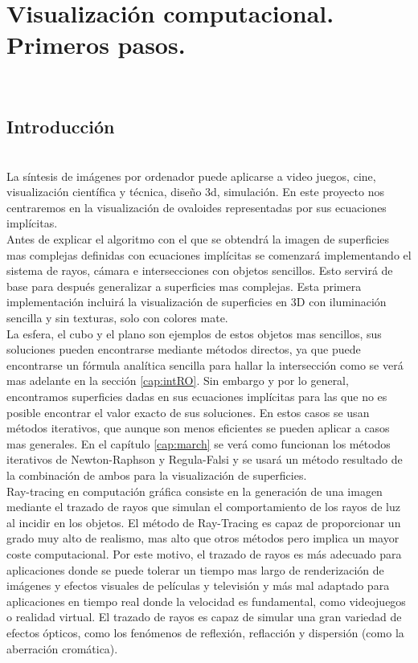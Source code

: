\chapter{Visualización computacional. Primeros pasos.}

${ }$\\
\section{Introducción}
${ }$\\

La síntesis de imágenes por ordenador puede aplicarse a video juegos, cine, visualización científica y técnica, diseño 3d, simulación. En este proyecto nos centraremos en la visualización de ovaloides representadas por sus ecuaciones implícitas.
${ }$\\

Antes de explicar el algoritmo con el que se obtendrá la imagen de superficies mas complejas definidas con ecuaciones implícitas se comenzará implementando el sistema de rayos, cámara e intersecciones con objetos sencillos. Esto servirá de base para después generalizar a superficies mas complejas. Esta primera implementación incluirá la visualización de superficies en 3D con iluminación sencilla y sin texturas, solo con colores mate.
${ }$\\

La esfera, el cubo y el plano son ejemplos de estos objetos mas sencillos, sus soluciones pueden encontrarse mediante métodos directos, ya que puede encontrarse un fórmula analítica sencilla para hallar la intersección como se verá mas adelante en la sección \ref{cap:intRO}. Sin embargo y por lo general, encontramos superficies dadas en sus ecuaciones implícitas para las que no es posible encontrar el valor exacto de sus soluciones. En estos casos se usan métodos iterativos, que aunque son menos eficientes se pueden aplicar a casos mas generales.  En el capítulo \ref{cap:march} se verá como funcionan los métodos iterativos de Newton-Raphson y Regula-Falsi y se usará un método resultado de la combinación de ambos para la visualización de superficies.
${ }$\\




Ray-tracing en computación gráfica consiste en la generación de una imagen mediante el trazado de rayos que simulan el comportamiento de los rayos de luz al incidir en los objetos. El método de Ray-Tracing es capaz de proporcionar un grado muy alto de realismo, mas alto que otros métodos pero implica un mayor coste computacional. Por este motivo, el trazado de rayos es más adecuado para aplicaciones donde se puede tolerar un tiempo mas largo de renderización de imágenes y efectos visuales de películas y televisión y más mal adaptado para aplicaciones en tiempo real donde la velocidad es fundamental, como videojuegos o realidad virtual. El trazado de rayos es capaz de simular una gran variedad de efectos ópticos, como los fenómenos de reflexión, reflacción y dispersión (como la aberración cromática).
${ }$\\


